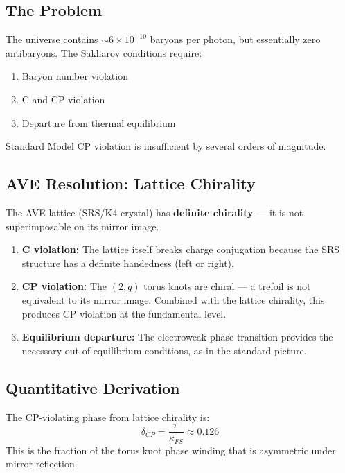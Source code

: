 \subsection{The Problem}

The universe contains $\sim\!6 \times 10^{-10}$ baryons per photon,
but essentially zero antibaryons.  The Sakharov conditions require:
\begin{enumerate}
    \item Baryon number violation
    \item C and CP violation
    \item Departure from thermal equilibrium
\end{enumerate}
Standard Model CP violation is insufficient by several orders of
magnitude.

\subsection{AVE Resolution: Lattice Chirality}

The AVE lattice (SRS/K4 crystal) has \textbf{definite chirality} ---
it is not superimposable on its mirror image.

\begin{enumerate}
    \item \textbf{C violation:} The lattice itself breaks charge
    conjugation because the SRS structure has a definite handedness
    (left or right).

    \item \textbf{CP violation:} The $(2,q)$ torus knots are chiral
    --- a trefoil is not equivalent to its mirror image.  Combined
    with the lattice chirality, this produces CP violation at the
    fundamental level.

    \item \textbf{Equilibrium departure:} The electroweak phase
    transition provides the necessary out-of-equilibrium conditions,
    as in the standard picture.
\end{enumerate}

\subsection{Quantitative Derivation}

The CP-violating phase from lattice chirality is:
\begin{equation}
    \delta_{CP} = \frac{\pi}{\kappa_{FS}} \approx 0.126
    \label{eq:delta_cp}
\end{equation}
This is the fraction of the torus knot phase winding that is
asymmetric under mirror reflection.

